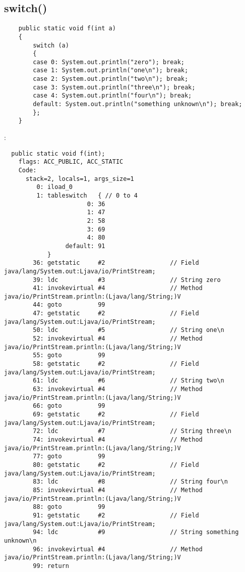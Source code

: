 \subsection{switch()}


\begin{lstlisting}
	public static void f(int a)
	{
		switch (a)
		{
		case 0: System.out.println("zero"); break;
		case 1: System.out.println("one\n"); break;
		case 2: System.out.println("two\n"); break;
		case 3: System.out.println("three\n"); break;
		case 4: System.out.println("four\n"); break;
		default: System.out.println("something unknown\n"); break;
		};
	}
\end{lstlisting}

:

\begin{lstlisting}
  public static void f(int);
    flags: ACC_PUBLIC, ACC_STATIC
    Code:
      stack=2, locals=1, args_size=1
         0: iload_0       
         1: tableswitch   { // 0 to 4
                       0: 36
                       1: 47
                       2: 58
                       3: 69
                       4: 80
                 default: 91
            }
        36: getstatic     #2                  // Field java/lang/System.out:Ljava/io/PrintStream;
        39: ldc           #3                  // String zero
        41: invokevirtual #4                  // Method java/io/PrintStream.println:(Ljava/lang/String;)V
        44: goto          99
        47: getstatic     #2                  // Field java/lang/System.out:Ljava/io/PrintStream;
        50: ldc           #5                  // String one\n
        52: invokevirtual #4                  // Method java/io/PrintStream.println:(Ljava/lang/String;)V
        55: goto          99
        58: getstatic     #2                  // Field java/lang/System.out:Ljava/io/PrintStream;
        61: ldc           #6                  // String two\n
        63: invokevirtual #4                  // Method java/io/PrintStream.println:(Ljava/lang/String;)V
        66: goto          99
        69: getstatic     #2                  // Field java/lang/System.out:Ljava/io/PrintStream;
        72: ldc           #7                  // String three\n
        74: invokevirtual #4                  // Method java/io/PrintStream.println:(Ljava/lang/String;)V
        77: goto          99
        80: getstatic     #2                  // Field java/lang/System.out:Ljava/io/PrintStream;
        83: ldc           #8                  // String four\n
        85: invokevirtual #4                  // Method java/io/PrintStream.println:(Ljava/lang/String;)V
        88: goto          99
        91: getstatic     #2                  // Field java/lang/System.out:Ljava/io/PrintStream;
        94: ldc           #9                  // String something unknown\n
        96: invokevirtual #4                  // Method java/io/PrintStream.println:(Ljava/lang/String;)V
        99: return        
\end{lstlisting}
